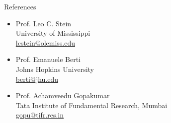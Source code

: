 \documentclass{resume} %
\begin{document}
\begin{rSection}{References}


\begin{itemize}
\item Prof. Leo C. Stein\\University of Mississippi\\ \href{lcstein@olemiss.edu}{lcstein@olemiss.edu}
\item Prof. Emanuele Berti\\Johns Hopkins University\\ \href{berti@jhu.edu}{berti@jhu.edu}
\item Prof. Achamveedu Gopakumar\\Tata Institute of Fundamental Research, Mumbai\\ \href{gopu@tifr.res.in}{gopu@tifr.res.in}
\end{itemize}


\end{rSection}
\end{document}
